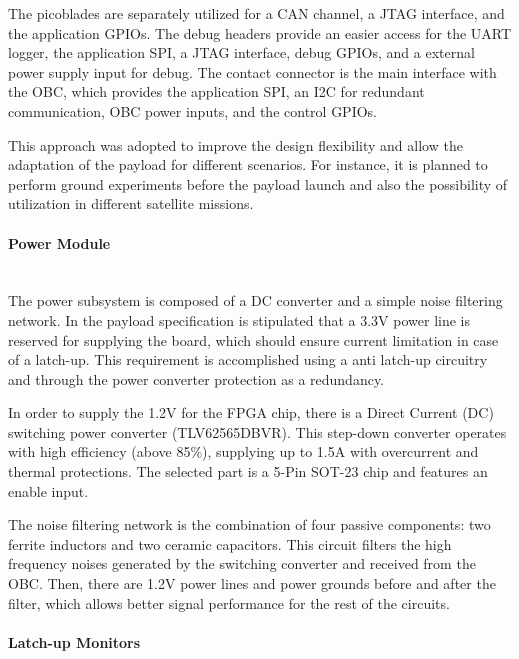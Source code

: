 The picoblades are separately utilized for a CAN channel, a JTAG interface, and the application GPIOs. The debug headers provide an easier access for the UART logger, the application SPI, a JTAG interface, debug GPIOs, and a external power supply input for debug. The contact connector is the main interface with the OBC, which provides the application SPI, an I2C for redundant communication, OBC power inputs, and the control GPIOs.

This approach was adopted to improve the design flexibility and allow the adaptation of the payload for different scenarios. For instance, it is planned to perform ground experiments before the payload launch and also the possibility of utilization in different satellite missions.

\paragraph{Power Module} \mbox{}\\

The power subsystem is composed of a DC converter and a simple noise filtering network. In the payload specification is stipulated that a 3.3V power line is reserved for supplying the board, which should ensure current limitation in case of a latch-up. This requirement is accomplished using a anti latch-up circuitry and through the power converter protection as a redundancy.

In order to supply the 1.2V for the FPGA chip, there is a Direct Current (DC) switching power converter (TLV62565DBVR). This step-down converter operates with high efficiency (above 85\%), supplying up to 1.5A with overcurrent and thermal protections. The selected part is a 5-Pin SOT-23 chip and features an enable input. 

The noise filtering network is the combination of four passive components: two ferrite inductors and two ceramic capacitors. This circuit filters the high frequency noises generated by the switching converter and received from the OBC. Then, there are 1.2V power lines and power grounds before and after the filter, which allows better signal performance for the rest of the circuits. 


\paragraph{Latch-up Monitors} \mbox{}\\

